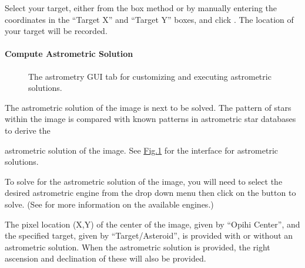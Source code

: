 \documentclass[letterpaper,11pt,english]{sphinxmanual}
\begin{document}
\sphinxAtStartPar
Select your target, either from the box method or by manually entering the
coordinates in the “Target X” and “Target Y” boxes, and click . The
location of your target will be recorded.


\paragraph{Compute Astrometric Solution}
\label{\detokenize{user/manual_mode:compute-astrometric-solution}}\label{\detokenize{user/manual_mode:user-manual-mode-procedure-find-asteroid-location-compute-astrometric-solution}}
\begin{figure}[htbp]
\centering
\capstart

\noindent{}
\caption{The astrometry GUI tab for customizing and executing astrometric solutions.}\label{\detokenize{user/manual_mode:id5}}\label{\detokenize{user/manual_mode:figure-manual-mode-gui-astrometry}}\end{figure}

\sphinxAtStartPar
The astrometric solution of the image is next to be solved. The pattern of
stars within the image is compared with known patterns in astrometric star
databases to derive the %
\begin{footnote}[6]\sphinxAtStartFootnote
{}
%
\end{footnote}
astrometric solution of the image. See \hyperref[\detokenize{user/manual_mode:figure-manual-mode-gui-astrometry}]{Fig.\@ \ref{\detokenize{user/manual_mode:figure-manual-mode-gui-astrometry}}}
for the interface for astrometric solutions.

\sphinxAtStartPar
To solve for the astrometric solution of the image, you will need to select
the desired astrometric engine from the drop down menu then click on the
 button to solve.
(See {\hyperref[\detokenize{technical/architecture/services_engines:technical-architecture-services-engines}]{}} for more information on
the available engines.)

\sphinxAtStartPar
The pixel location (X,Y) of the center of the image, given by “Opihi Center”,
and the specified target, given by “Target/Asteroid”, is provided with or
without an astrometric solution. When the astrometric solution is provided,
the right ascension and declination of these will also be provided.
\end{document}
